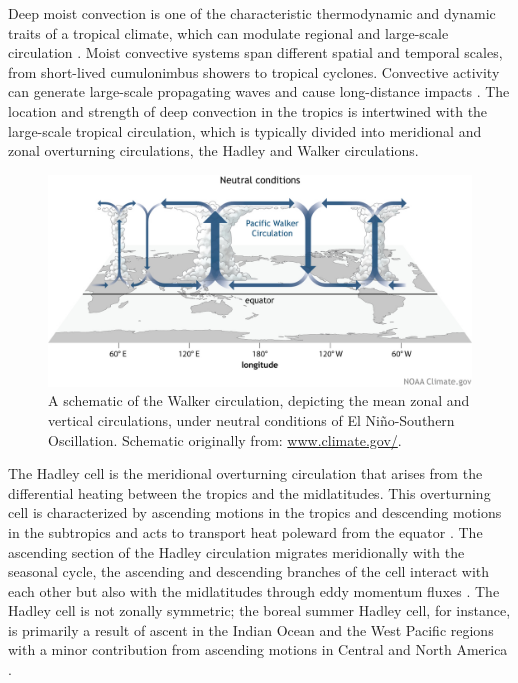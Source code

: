 
 Deep moist convection is one of the characteristic thermodynamic and dynamic traits of a tropical climate, which can modulate regional and large-scale circulation \citep{emanuel1994atmospheric,webster2020dynamics}.  Moist convective systems span different spatial and temporal scales, from short-lived cumulonimbus showers to tropical cyclones. 
Convective activity can generate large-scale propagating waves and cause long-distance impacts \citep{hartmann2015,li2018fundamentals}.
The location and strength of deep convection in the tropics is intertwined with the large-scale tropical circulation, which is typically divided into meridional and zonal overturning circulations, the Hadley and Walker circulations. 
 
\begin{figure}[t!]
\includegraphics[width=\linewidth]{figures/Walker_Neutral_large.jpg}
\caption[The Walker circulation]{A schematic of the Walker circulation, depicting the mean zonal and vertical circulations, under neutral conditions of El Niño-Southern Oscillation. Schematic originally from: \url{www.climate.gov/}. }
\label{fig:walker_schematic}
\end{figure}
 
 
The Hadley cell is the meridional overturning circulation that arises from the differential heating between the tropics and the midlatitudes. This overturning cell is characterized by ascending motions in the tropics and descending motions in the subtropics and acts to transport heat poleward from the equator \citep{lorenz1967}.  The ascending section of the Hadley circulation migrates meridionally with the seasonal cycle, the ascending and descending branches of the cell interact with each other but also with the midlatitudes through eddy momentum fluxes \citep{bordoni2008monsoons}. 
The Hadley cell is not zonally symmetric; the boreal summer Hadley cell, for instance,  is primarily a result of ascent in the Indian Ocean and the West Pacific regions with a minor contribution from ascending motions in Central and North America \citep{hoskins2020}. 

